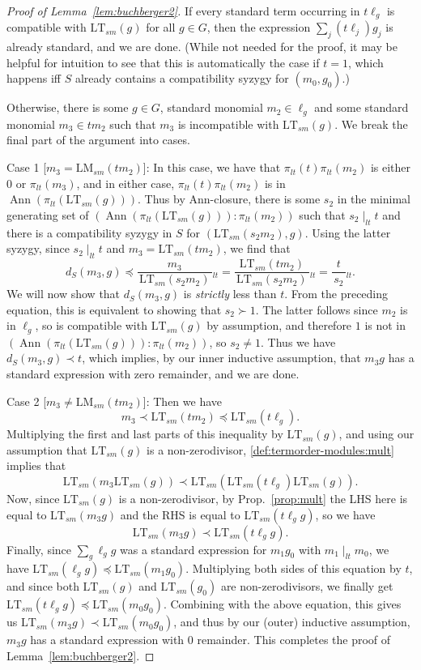 \documentclass[11pt,reqno]{amsart}
\newcommand{\suchthat}{:}
\newcommand{\ltfrac}[2]{\frac{\,#1\,}{\,#2\,}{}_{{\scriptscriptstyle lt}}}
\newcommand{\ltdivides}{\mid_{lt}}
\DeclareMathOperator{\Ann}{Ann}
\newcommand{\lmsm}{\text{LM}_{sm}}
\newcommand{\ltsm}{\text{LT}_{sm}}
\newcommand{\piltd}{\pi_{lt}}
\theoremstyle{definition}
\numberwithin{equation}{section}
\begin{document}
\begin{proof}[Proof of Lemma~\ref{lem:buchberger2}]
If every standard term occurring in $t\ell_g$ is compatible with $\ltsm(g)$ for all $g \in G$, then the expression $\sum_j (t \ell_j) g_j$ is already standard, and we are done. (While not needed for the proof, it may be helpful for intuition to see that this is automatically the case if $t=1$, which happens iff $S$ already contains a compatibility syzygy for $(m_0, g_0)$.)

Otherwise, there is some $g \in G$, standard monomial $m_2 \in \ell_g$ and some standard monomial $m_3 \in tm_2$ such that $m_3$ is incompatible with $\ltsm(g)$. We break the final part of the argument into cases.

Case 1 [$m_3 = \lmsm(tm_2)$]: In this case, we have that $\pi_{lt}(t) \pi_{lt}(m_2)$ is either 0 or $\pi_{lt}(m_3)$, and in either case, $\pi_{lt}(t) \pi_{lt}(m_2)$ is in $\Ann(\piltd(\ltsm(g)))$. Thus by Ann-closure, there is some $s_2$ in the minimal generating set of $(\Ann(\piltd(\ltsm(g))) \suchthat \pi_{lt}(m_2))$ such that $s_2 \mid_{lt} t$ and there is a compatibility syzygy in $S$ for $(\ltsm(s_2 m_2), g)$. Using the latter syzygy, since $s_2 \mid_{lt} t$ and $m_3 = \ltsm(tm_2)$, we find that 
\[
d_S(m_3, g) \preceq \ltfrac{m_3}{\ltsm(s_2 m_2)} = \ltfrac{\ltsm(t m_2)}{\ltsm(s_2 m_2)} = \ltfrac{t}{s_2}.
\]
We will now show that $d_S(m_3,g)$ is \emph{strictly} less than $t$. From the preceding equation, this is equivalent to showing that $s_2 \succ 1$. The latter follows since $m_2$ is in $\ell_g$, so is compatible with $\ltsm(g)$ by assumption, and therefore $1$ is not in $(\Ann(\piltd(\ltsm(g))) \suchthat \pi_{lt}(m_2))$, so $s_2 \neq 1$. Thus we have $d_S(m_3, g) \prec t$, which implies, by our inner inductive assumption, that $m_3 g$ has a standard expression with zero remainder, 
and we are done.

Case 2 [$m_3 \neq \lmsm(t m_2)$]: Then we have 
\begin{equation} \label{eq:Ann1}
m_3 \prec \ltsm(tm_2) \preceq \ltsm(t\ell_g).
\end{equation}
Multiplying the first and last parts of this inequality by $\ltsm(g)$, and using our assumption that $\ltsm(g)$ is a non-zerodivisor, \ref{def:termorder-modules:mult} implies that 
\begin{equation} \label{eq:Ann2}
\ltsm(m_3 \ltsm(g)) \prec \ltsm(\ltsm(t \ell_g) \ltsm(g)).
\end{equation} 
Now, since $\ltsm(g)$ is a non-zerodivisor, by Prop.~\ref{prop:mult} the LHS here is equal to $\ltsm(m_3 g)$ and the RHS is equal to $\ltsm(t\ell_g g)$, so we have
\[
\ltsm(m_3 g) \prec \ltsm(t \ell_g g).
\]
Finally, since $\sum_g \ell_g g$ was a standard expression for $m_1 g_0$ with $m_1 \ltdivides m_0$, we have $\ltsm(\ell_g g) \preceq \ltsm(m_1 g_0)$. Multiplying both sides of this equation by $t$, and since both $\ltsm(g)$ and $\ltsm(g_0)$ are non-zerodivisors, we finally get $\ltsm(t \ell_g g) \preceq \ltsm(m_0 g_0)$. Combining with the above equation, this gives us $\ltsm(m_3 g) \prec \ltsm(m_0 g_0)$, and thus by our (outer) inductive assumption, $m_3 g$ has a standard expression with 0 remainder. This completes the proof of Lemma~\ref{lem:buchberger2}.
\end{proof}
\end{document}
